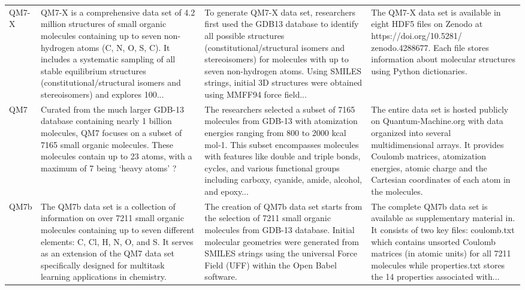 \documentclass[12pt]{article}
\begin{document}
\begin{longtable}{p{}p{}p{}p{}}
QM7-X \cite{ds6-33} & QM7-X is a comprehensive data set of 4.2 million structures of small organic molecules containing up to seven non-hydrogen atoms (C, N, O, S, C). It includes a systematic sampling of all stable equilibrium structures (constitutional/structural isomers and stereoisomers) and explores 100... & To generate QM7-X data set, researchers first used the GDB13 database to identify all possible structures (constitutional/structural isomers and stereoisomers) for molecules with up to seven non-hydrogen atoms. Using SMILES strings, initial 3D structures were obtained using MMFF94 force field... & The QM7-X data set is available in eight HDF5 files on Zenodo at https://doi.org/10.5281/ zenodo.4288677. Each file stores information about molecular structures using Python dictionaries. \cite{ds6-81} \\
QM7 \cite{ds7-32} & Curated from the much larger GDB-13 database containing nearly 1 billion molecules, QM7 focuses on a subset of 7165 small organic molecules. These molecules contain up to 23 atoms, with a maximum of 7 being `heavy atoms' ? & The researchers selected a subset of 7165 molecules from GDB-13 with atomization energies ranging from 800 to 2000 kcal mol-1. This subset encompasses molecules with features like double and triple bonds, cycles, and various functional groups including carboxy, cyanide, amide, alcohol, and epoxy... & The entire data set is hosted publicly on Quantum-Machine.org with data organized into several multidimensional arrays. It provides Coulomb matrices, atomization energies, atomic charge and the Cartesian coordinates of each atom in the molecules. \cite{ds7-83} \\
QM7b \cite{ds8-34} & The QM7b data set is a collection of information on over 7211 small organic molecules containing up to seven different elements: C, Cl, H, N, O, and S. It serves as an extension of the QM7 data set specifically designed for multitask learning applications in chemistry. & The creation of QM7b data set starts from the selection of 7211 small organic molecules from GDB-13 database. Initial molecular geometries were generated from SMILES strings using the universal Force Field (UFF) within the Open Babel software. & The complete QM7b data set is available as supplementary material in. It consists of two key files: coulomb.txt which contains unsorted Coulomb matrices (in atomic units) for all 7211 molecules while properties.txt stores the 14 properties associated with... \cite{ds8-34} \\

\end{longtable}
\end{document}
